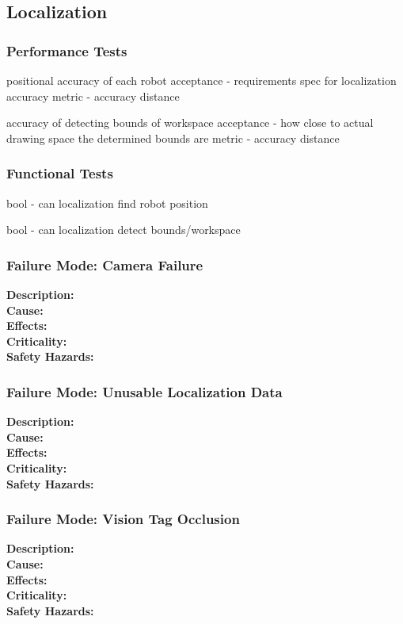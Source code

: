 
\subsection{Localization}
\label{sec:verification_localization}


\subsubsection{Performance Tests}
\label{sec:localization_pt}

positional accuracy of each robot
acceptance - requirements spec for localization accuracy
metric - accuracy distance

accuracy of detecting bounds of workspace
acceptance - how close to actual drawing space the determined bounds are
metric - accuracy distance

\subsubsection{Functional Tests}
\label{sec:localization_ft}

bool - can localization find robot position

bool - can localization detect bounds/workspace 


\subsubsection{Failure Mode: Camera Failure}
\label{sec:localization_cam}
\textbf{Description:} \\
\textbf{Cause:} \\
\textbf{Effects:}  \\
\textbf{Criticality:}  \\
\textbf{Safety Hazards:} \\

\subsubsection{Failure Mode: Unusable Localization Data}
\label{sec:localization_unusable}
\textbf{Description:} \\
\textbf{Cause:} \\
\textbf{Effects:}  \\
\textbf{Criticality:}  \\
\textbf{Safety Hazards:} \\

\subsubsection{Failure Mode: Vision Tag Occlusion}
\label{sec:localization_occlusion}
\textbf{Description:} \\
\textbf{Cause:} \\
\textbf{Effects:}  \\
\textbf{Criticality:}  \\
\textbf{Safety Hazards:} \\

